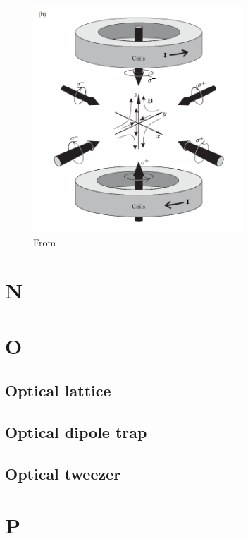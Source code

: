\documentclass{book}
\theoremstyle{definition}
\begin{document}
\begin{figure}[!htb]
	\centering
	\includegraphics[width=0.7\textwidth]{images/foot_2}
	\caption{From \cite{foot2005atomic}}
\end{figure}


\chapter*{N}
\chapter*{O}



\section*{Optical lattice}


\section*{Optical dipole trap}


\section*{Optical tweezer}


\chapter*{P}
\end{document}
